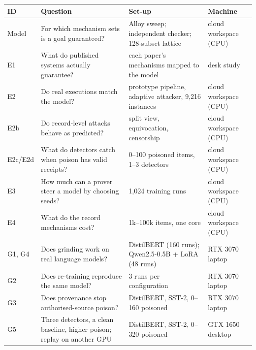 \begin{center}\small
\begin{tabularx}{\textwidth}{@{}l>{\raggedright}X>{\raggedright}X>{\raggedright\arraybackslash}X@{}}
\toprule
ID & Question & Set-up & Machine\\
\midrule
Model & For which mechanism sets is a goal guaranteed? & Alloy sweep; independent checker; 128-subset lattice & cloud workspace (CPU)\\
E1 & What do published systems actually guarantee? & each paper's mechanisms mapped to the model & desk study\\
E2 & Do real executions match the model? & prototype pipeline, adaptive attacker, 9,216 instances & cloud workspace (CPU)\\
E2b & Do record-level attacks behave as predicted? & split view, equivocation, censorship & cloud workspace (CPU)\\
E2c/E2d & What do detectors catch when poison has valid receipts? & 0--100 poisoned items, 1--3 detectors & cloud workspace (CPU)\\
E3 & How much can a prover steer a model by choosing seeds? & 1,024 training runs & cloud workspace (CPU)\\
E4 & What do the record mechanisms cost? & 1k--100k items, one core & cloud workspace (CPU)\\
G1, G4 & Does grinding work on real language models? & DistilBERT (160 runs); Qwen2.5-0.5B + LoRA (48 runs) & RTX 3070 laptop\\
G2 & Does re-training reproduce the same model? & 3 runs per configuration & RTX 3070 laptop\\
G3 & Does provenance stop authorised-source poison? & DistilBERT, SST-2, 0--160 poisoned & RTX 3070 laptop\\
G5 & Three detectors, a clean baseline, higher poison; replay on another GPU & DistilBERT, SST-2, 0--320 poisoned & GTX 1650 desktop\\
\bottomrule
\end{tabularx}
\end{center}

